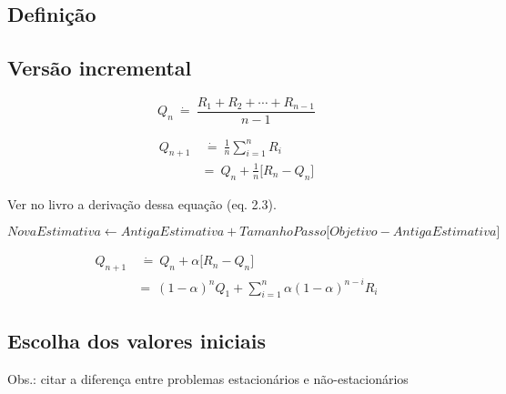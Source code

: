 \documentclass{article}
\begin{document}
    \subsection{Definição}
    
    \subsection{Versão incremental}
        
        \begin{equation}
            Q_n \ \dot{=} \ \frac{R_1 + R_2 + \cdots + R_{n-1}}{n - 1}
        \end{equation}
        
        \begin{equation}
        \begin{split}
            Q_{n+1} & \ \dot{=} \ \frac{1}{n} \sum_{i=1}^{n} R_i \\
            & = \ Q_n + \frac{1}{n} \Big[ R_n - Q_n \Big]
        \end{split}
        \end{equation}
        
        Ver no livro a derivação dessa equação (eq. 2.3).
        
        \begin{equation}
            NovaEstimativa \leftarrow AntigaEstimativa + TamanhoPasso \Big[ Objetivo - AntigaEstimativa \Big]
        \end{equation}
        
        \begin{equation}
        \begin{split}
            Q_{n+1} & \ \dot{=} \ Q_n + \alpha \Big[ R_n - Q_n \Big] \\
            & = \ (1 - \alpha)^n Q_1 + \sum_{i=1}^{n} \alpha (1 - \alpha)^{n - i} R_i
        \end{split}
        \end{equation}
        
    \subsection{Escolha dos valores iniciais}
        
        Obs.: citar a diferença entre problemas estacionários e não-estacionários
    
\end{document}
